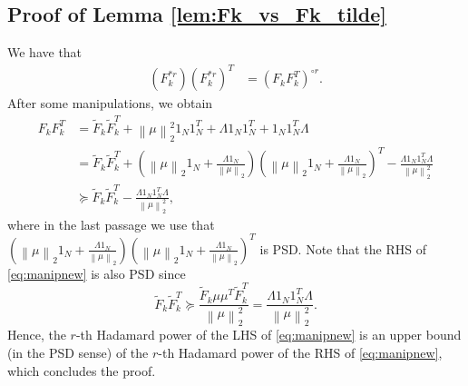 \documentclass[11pt]{article}
\newcommand{\revision}[1]{#1}
\newenvironment{proof}{\par\noindent{\bf Proof:\ }}{\hfill$\Box$\\[2mm]}
\newcommand{\norm}[1]{\left\|#1\right\|}
\begin{document}
\subsection{Proof of Lemma \ref{lem:Fk_vs_Fk_tilde}}\label{app:lem:Fk_vs_Fk_tilde}
\revision{    We have that
    \begin{equation}\label{eq:Hprod}
	\begin{split}
	    (F_{k}^{*r}) (F_{k}^{*r})^T 
	    &= \left(F_{k} F_{k}^T\right)^{\circ r}.
	\end{split}
    \end{equation}    
After some manipulations, we obtain
    \begin{equation}\label{eq:manipnew}
    \begin{split}
	F_{k}F_{k}^T 
	&= \tilde F_{k} \tilde F_{k}^T + \norm{\mu}_2^2 1_N1_N^T + \Lambda 1_N 1_N^T + 1_N 1_N^T\Lambda \\
	&= \tilde F_{k} \tilde F_{k}^T + \left(\norm{\mu}_2 1_N+\frac{\Lambda 1_N}{\norm{\mu}_2}\right)\left(\norm{\mu}_2 1_N+\frac{\Lambda 1_N}{\norm{\mu}_2}\right)^T -\frac{\Lambda 1_N 1_N^T\Lambda}{\norm{\mu}_2^2} \\
	&\succeq \tilde F_{k} \tilde F_{k}^T -\frac{\Lambda 1_N 1_N^T\Lambda}{\norm{\mu}_2^2},
    \end{split} 
    \end{equation}   
    where in the last passage we use that $\left(\norm{\mu}_2 1_N+\frac{\Lambda 1_N}{\norm{\mu}_2}\right)\left(\norm{\mu}_2 1_N+\frac{\Lambda 1_N}{\norm{\mu}_2}\right)^T$ is PSD. Note that the RHS of \eqref{eq:manipnew} is also PSD since 
    \begin{equation*}
   \tilde F_{k} \tilde F_{k}^T \succeq \frac{\tilde F_{k} \mu\mu^T\tilde F_{k}^T}{\norm{\mu}_2^2}=\frac{\Lambda 1_N 1_N^T\Lambda}{\norm{\mu}_2^2}.
    \end{equation*}
    Hence, the $r$-th Hadamard power of the LHS of \eqref{eq:manipnew} is an upper bound (in the PSD sense) of the $r$-th Hadamard power of the RHS of \eqref{eq:manipnew}, which concludes the proof.}
\end{document}
